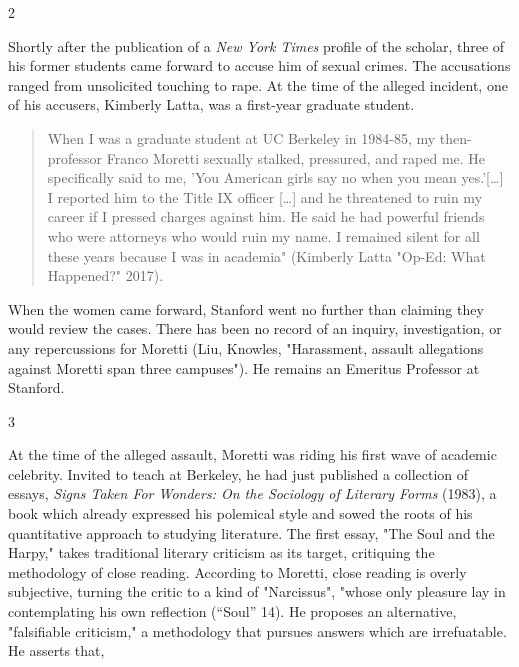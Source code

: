 \documentclass[11pt]{article}
\begin{document}
2

Shortly after the publication of a \emph{New York Times} profile of the
scholar, three of his former students came forward to accuse him of
sexual crimes. The accusations ranged from unsolicited touching to
rape. At the time of the alleged incident, one of his accusers,
Kimberly Latta, was a first-year graduate student.
\begin{quote}
When I was a graduate student at UC Berkeley in 1984-85, my
then-professor Franco Moretti sexually stalked, pressured, and raped
me. He specifically said to me, 'You American girls say no when you
mean yes.'[\ldots{}] I reported him to the Title IX officer [\ldots{}] and he
threatened to ruin my career if I pressed charges against him. He said
he had powerful friends who were attorneys who would ruin my name. I
remained silent for all these years because I was in academia"
(Kimberly Latta "Op-Ed: What Happened?" 2017).
\end{quote}
When the women came forward, Stanford went no further than claiming
they would review the cases. There has been no record of an inquiry,
investigation, or any repercussions for Moretti (Liu, Knowles,
"Harassment, assault allegations against Moretti span three
campuses"). He remains an Emeritus Professor at Stanford.

3

At the time of the alleged assault, Moretti was riding his first wave
of academic celebrity. Invited to teach at Berkeley, he had just
published a collection of essays, \emph{Signs Taken For Wonders: On the
Sociology of Literary Forms} (1983), a book which already expressed
his polemical style and sowed the roots of his quantitative approach
to studying literature. The first essay, "The Soul and the Harpy,"
takes traditional literary criticism as its target, critiquing the
methodology of close reading. According to Moretti, close reading is
overly subjective, turning the critic to a kind of "Narcissus", "whose
only pleasure lay in contemplating his own reflection (“Soul” 14). He
proposes an alternative, "falsifiable criticism," a methodology that
pursues answers which are irrefuatable. He asserts that,
\end{document}
